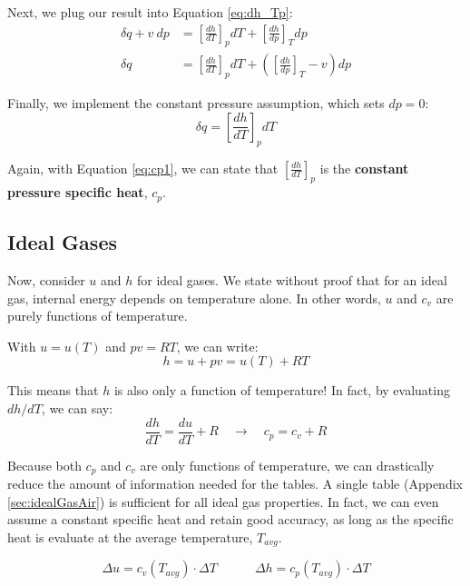 Next, we plug our result into Equation \ref{eq:dh_Tp}:
\begin{align*}
  \delta q + v\: dp &= \left[\frac{d h}{d T}\right]_p dT + \left[\frac{d h}{d p}\right]_T dp \\
  \delta q &= \left[\frac{d h}{d T}\right]_p dT + \left(\left[\frac{d h}{d p}\right]_T  - v \right)dp
\end{align*}

Finally, we implement the constant pressure assumption, which sets $dp=0$:
\begin{equation} \label{eq:cp1}
  \delta q = \left[\frac{d h}{d T}\right]_p dT
\end{equation}

Again, with Equation \ref{eq:cp1}, we can state that $\left[\frac{d h}{d T}\right]_p$ is the {\bf constant pressure specific heat}, $c_p$.

\subsection{Ideal Gases}
Now, consider $u$ and $h$ for ideal gases.  We state without proof that for an ideal gas, internal energy depends on temperature alone.  In other words, $u$ and $c_v$ are purely functions of temperature.

With $u=u(T)$ and $pv = RT$, we can write:
\begin{equation*}
  h = u + pv = u(T) + RT
\end{equation*}

This means that $h$ is also only a function of temperature!  In fact, by evaluating $d h/d T$, we can say:
\begin{equation} \label{eq:ch3_cpcvR}
  \frac{d h}{d T} = \frac{d u}{d T} + R \quad\rightarrow\quad c_p = c_v + R
\end{equation}

Because both $c_p$ and $c_v$ are only functions of temperature, we can drastically reduce the amount of information needed for the tables.  A single table (Appendix \ref{sec:idealGasAir}) is sufficient for all ideal gas properties. In fact, we can even assume a constant specific heat and retain good accuracy, as long as the specific heat is evaluate at the average temperature, $T_{avg}$.

\begin{equation}
  \Delta u = c_v(T_{avg})\cdot \Delta T  \quad \quad\quad \Delta h = c_p(T_{avg})\cdot \Delta T
\end{equation}

